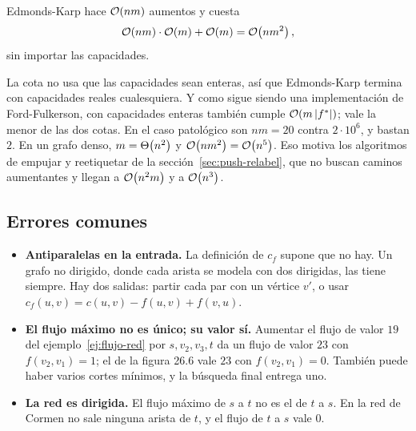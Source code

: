 \documentclass[11pt,letterpaper]{article}
\begin{document}
\begin{resultado}
  Edmonds-Karp hace $\mathcal{O}\!\left(nm\right)$ aumentos y cuesta
  \[
    \mathcal{O}\!\left(nm\right) \cdot \mathcal{O}\!\left(m\right) + \mathcal{O}\!\left(m\right) = \mathcal{O}\!\left(n m^2\right) ,
  \]
  sin importar las capacidades.
\end{resultado}

La cota no usa que las capacidades sean enteras, así que Edmonds-Karp
termina con capacidades reales cualesquiera. Y como sigue siendo una
implementación de Ford-Fulkerson, con capacidades enteras también
cumple $\mathcal{O}\!\left(m \left\lvert f^* \right\rvert\right)$; vale la menor de las dos cotas. En el caso
patológico son $nm = 20$ contra $2 \cdot 10^6$, y bastan $2$. En un
grafo denso, $m = \Theta\!\left(n^2\right)$ y $\mathcal{O}\!\left(n m^2\right) = \mathcal{O}\!\left(n^5\right)$. Eso motiva
los algoritmos de empujar y reetiquetar de la
sección~\ref{sec:push-relabel}, que no buscan caminos aumentantes y
llegan a $\mathcal{O}\!\left(n^2 m\right)$ y a $\mathcal{O}\!\left(n^3\right)$.


\subsection*{Errores comunes}

\begin{ojo}
  \begin{itemize}
    \item \textbf{Antiparalelas en la entrada.} La definición de $c_f$
          supone que no hay. Un grafo no dirigido, donde cada arista
          se modela con dos dirigidas, las tiene siempre. Hay dos
          salidas: partir cada par con un vértice $v'$, o usar
          $c_f(u, v) = c(u, v) - f(u, v) + f(v, u)$.
    \item \textbf{El flujo máximo no es único; su valor sí.} Aumentar
          el flujo de valor $19$ del ejemplo~\ref{ej:flujo-red} por
          $s, v_2, v_3, t$ da un flujo de valor $23$ con
          $f(v_2, v_1) = 1$; el de la figura 26.6 vale $23$ con
          $f(v_2, v_1) = 0$. También puede haber varios cortes
          mínimos, y la búsqueda final entrega uno.
    \item \textbf{La red es dirigida.} El flujo máximo de $s$ a $t$
          no es el de $t$ a $s$. En la red de Cormen no sale ninguna
          arista de $t$, y el flujo de $t$ a $s$ vale $0$.
  \end{itemize}
\end{ojo}

\newpage

\end{document}
